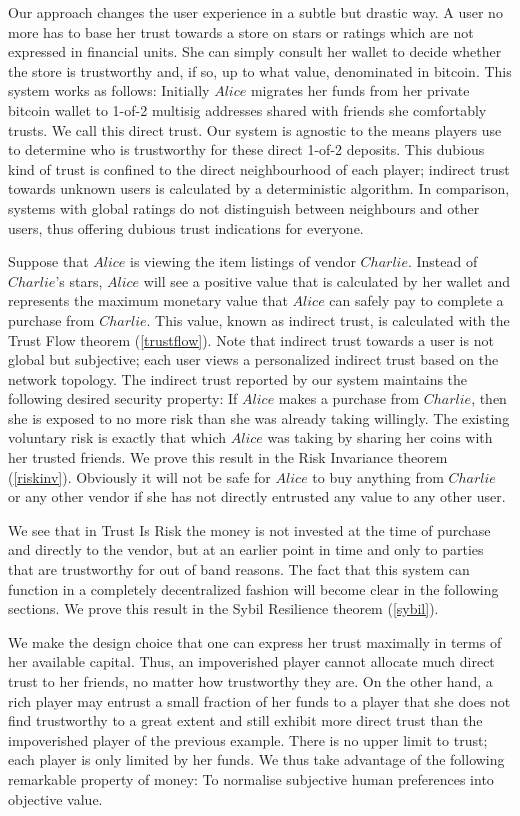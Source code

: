  Our approach changes the user experience in a subtle but drastic way. A user no more has to base her trust towards a
  store on stars or ratings which are not expressed in financial units. She can simply consult her wallet to decide whether
  the store is trustworthy and, if so, up to what value, denominated in bitcoin. This system works as follows: Initially
  $Alice$ migrates her funds from her private bitcoin wallet to 1-of-2 multisig addresses shared with friends she
  comfortably trusts. We call this direct trust. Our system is agnostic to the means players use to determine who is
  trustworthy for these direct 1-of-2 deposits. This dubious kind of trust is confined to the direct neighbourhood of each
  player; indirect trust towards unknown users is calculated by a deterministic algorithm. In comparison, systems with global
  ratings do not distinguish between neighbours and other users, thus offering dubious trust indications for everyone.

  Suppose that $Alice$ is viewing the item listings of vendor $Charlie$. Instead of $Charlie$'s stars, $Alice$ will see a
  positive value that is calculated by her wallet and represents the maximum monetary value that $Alice$ can safely pay to
  complete a purchase from $Charlie$. This value, known as indirect trust, is calculated with the Trust Flow theorem
  (\ref{trustflow}). Note that indirect trust towards a user is not global but subjective; each user views a personalized
  indirect trust based on the network topology. The indirect trust reported by our system maintains the following desired
  security property: If $Alice$ makes a purchase from $Charlie$, then she is exposed to no more risk than she was already
  taking willingly. The existing voluntary risk is exactly that which $Alice$ was taking by sharing her coins with her
  trusted friends. We prove this result in the Risk Invariance theorem (\ref{riskinv}). Obviously it will not be safe for
  $Alice$ to buy anything from $Charlie$ or any other vendor if she has not directly entrusted any value to any other user.

  We see that in Trust Is Risk the money is not invested at the time of purchase and directly to the vendor, but at an
  earlier point in time and only to parties that are trustworthy for out of band reasons. The fact that this system can
  function in a completely decentralized fashion will become clear in the following sections. We prove this result in the
  Sybil Resilience theorem (\ref{sybil}).

  We make the design choice that one can express her trust maximally in terms of her available capital. Thus, an impoverished
  player cannot allocate much direct trust to her friends, no matter how trustworthy they are. On the other hand, a rich
  player may entrust a small fraction of her funds to a player that she does not find trustworthy to a great extent and still
  exhibit more direct trust than the impoverished player of the previous example. There is no upper limit to trust; each
  player is only limited by her funds. We thus take advantage of the following remarkable property of money: To normalise
  subjective human preferences into objective value.

